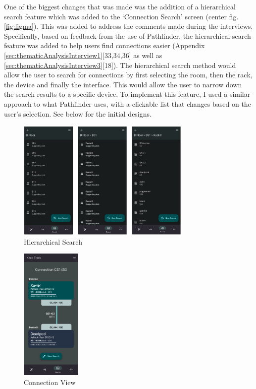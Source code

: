 \documentclass [11pt,a4paper]{article}
\begin{document}
One of the biggest changes that was made was the addition of a hierarchical search feature which was added to the `Connection Search' screen (center fig.\ref{fig:figma}). This was added to address the comments made during the interviews. Specifically, based on feedback from the use of Pathfinder, the hierarchical search feature was added to help users find connections easier (Appendix \ref{sec:thematicAnalysisInterview1}[33,34,36] as well as \ref{sec:thematicAnalysisInterview3}[18]). The hierarchical search method would allow the user to search for connections by first selecting the room, then the rack, the device and finally the interface. This would allow the user to narrow down the search results to a specific device. To implement this feature, I used a similar approach to what Pathfinder \cite{PathfinderMobile} uses, with a clickable list that changes based on the user's selection. See below for the initial designs.

\begin{figure}[H]
    \centering
    \includegraphics[width=0.75\textwidth]{images/heirarchy_search.png}
    \caption{Hierarchical Search}
    \label{fig:hierarchical_search}
\end{figure}
\begin{figure}
    \centering
    \includegraphics[width=0.26\textwidth]{images/connection_display.png}
    \caption{Connection View}
    \label{fig:connection_card}
\end{figure}
\end{document}
